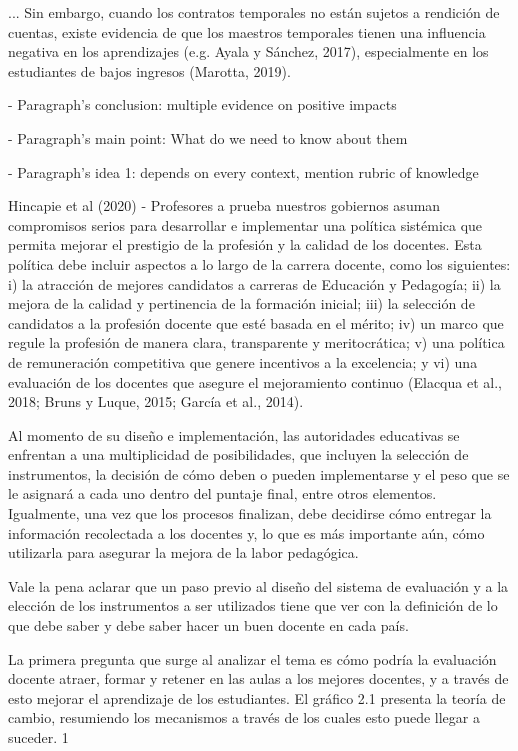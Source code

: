 ... Sin embargo, cuando los contratos temporales no están sujetos a rendición de cuentas, existe evidencia de que los maestros temporales tienen una influencia negativa en los aprendizajes (e.g. Ayala y Sánchez, 2017), especialmente en los estudiantes de bajos ingresos (Marotta, 2019).

- Paragraph's conclusion: multiple evidence on positive impacts






- Paragraph's main point: What do we need to know about them

- Paragraph's idea 1: depends on every context, mention rubric of knowledge

Hincapie et al (2020) - Profesores a prueba
nuestros gobiernos asuman compromisos serios para desarrollar e implementar una política sistémica que permita mejorar el prestigio de la profesión y la calidad de los docentes. Esta política debe incluir aspectos a lo largo de la carrera docente, como los siguientes: i) la atracción de mejores candidatos a carreras de Educación y Pedagogía; ii) la mejora de la calidad y pertinencia de la formación inicial; iii) la selección de candidatos a la profesión docente que esté basada en el mérito; iv) un marco que regule la profesión de manera clara, transparente y meritocrática; v) una política de remuneración competitiva que genere incentivos a la excelencia; y vi) una evaluación de los docentes que asegure el mejoramiento continuo (Elacqua et al., 2018; Bruns y Luque, 2015; García et al., 2014).

Al momento de su diseño e implementación, las autoridades educativas se enfrentan a una multiplicidad de posibilidades, que incluyen la selección de instrumentos, la decisión de cómo deben o pueden implementarse y el peso que se le asignará a cada uno dentro del puntaje final, entre otros elementos. Igualmente, una vez que los procesos finalizan, debe decidirse cómo entregar la información recolectada a los docentes y, lo que es más importante aún, cómo utilizarla para asegurar la mejora de la labor pedagógica.

Vale la pena aclarar que un paso previo al diseño del sistema de evaluación y a la elección de los instrumentos a ser utilizados tiene que ver con la definición de lo que debe saber y debe saber hacer un buen docente en cada país.

La primera pregunta que surge al analizar el tema es cómo podría la evaluación docente atraer, formar y retener en las aulas a los mejores docentes, y a través de esto mejorar el aprendizaje de los estudiantes. El gráfico 2.1 presenta la teoría de cambio, resumiendo los
mecanismos a través de los cuales esto puede llegar a suceder. 1

